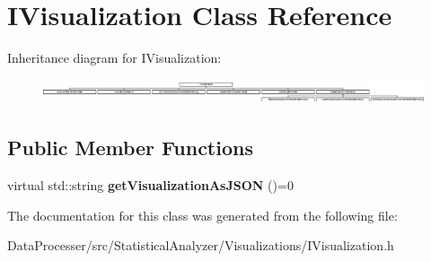 \hypertarget{classIVisualization}{}\section{I\+Visualization Class Reference}
\label{classIVisualization}
Inheritance diagram for I\+Visualization\+:\begin{figure}[H]
\begin{center}
\leavevmode
\includegraphics[height=0.727273cm]{classIVisualization}
\end{center}
\end{figure}
\subsection*{Public Member Functions}
\begin{DoxyCompactItemize}
\item 
\mbox{\label{classIVisualization_a425d9ec81e192e1264a2b716698449cb}} 
virtual std\+::string {\bfseries get\+Visualization\+As\+J\+S\+ON} ()=0
\end{DoxyCompactItemize}


The documentation for this class was generated from the following file\+:\begin{DoxyCompactItemize}
\item 
Data\+Processer/src/\+Statistical\+Analyzer/\+Visualizations/I\+Visualization.\+h\end{DoxyCompactItemize}
